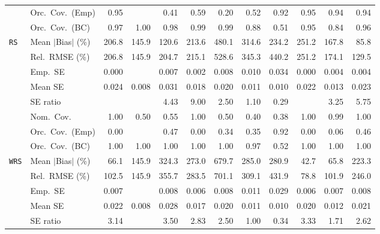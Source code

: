 \begin{landscape}
\begin{longtable}{llrrrrrrrrrr}
 & Orc.\ Cov.\ (Emp) & \cellcolor{rankone}0.95 &  & 0.41 & 0.59 & 0.20 & 0.52 & 0.92 & \cellcolor{ranktwo}0.95 & 0.94 & \cellcolor{rankthree}0.94 \\
 & Orc.\ Cov.\ (BC) & \cellcolor{rankthree}0.97 & 1.00 & 0.98 & 0.99 & 0.99 & 0.88 & 0.51 & \cellcolor{rankone}0.95 & 0.84 & \cellcolor{ranktwo}0.96 \\
\addlinespace[2pt]
\quad \texttt{RS} & Mean $|$Bias$|$ (\%) & 206.8 & \cellcolor{rankthree}145.9 & \cellcolor{ranktwo}120.6 & 213.6 & 480.1 & 314.6 & 234.2 & 251.2 & 167.8 & \cellcolor{rankone}85.8 \\
 & Rel.\ RMSE (\%) & 206.8 & \cellcolor{ranktwo}145.9 & 204.7 & 215.1 & 528.6 & 345.3 & 440.2 & 251.2 & \cellcolor{rankthree}174.1 & \cellcolor{rankone}129.5 \\
 & Emp.\ SE & 0.000 &  & 0.007 & 0.002 & 0.008 & 0.010 & 0.034 & 0.000 & 0.004 & 0.004 \\
 & Mean SE & 0.024 & 0.008 & 0.031 & 0.018 & 0.020 & 0.011 & 0.010 & 0.022 & 0.013 & 0.023 \\
 & SE ratio &  &  & 4.43 & 9.00 & \cellcolor{rankthree}2.50 & \cellcolor{rankone}1.10 & \cellcolor{ranktwo}0.29 &  & 3.25 & 5.75 \\
 & Nom.\ Cov. & \cellcolor{ranktwo}1.00 & 0.50 & 0.55 & \cellcolor{rankthree}1.00 & 0.50 & 0.40 & 0.38 & 1.00 & \cellcolor{rankone}0.99 & 1.00 \\
 & Orc.\ Cov.\ (Emp) & 0.00 &  & \cellcolor{ranktwo}0.47 & 0.00 & 0.34 & 0.35 & \cellcolor{rankone}0.92 & 0.00 & 0.06 & \cellcolor{rankthree}0.46 \\
 & Orc.\ Cov.\ (BC) & \cellcolor{ranktwo}1.00 & \cellcolor{rankthree}1.00 & 1.00 & 1.00 & 1.00 & \cellcolor{rankone}0.97 & 0.52 & 1.00 & 1.00 & 1.00 \\
\addlinespace[2pt]
\quad \texttt{WRS} & Mean $|$Bias$|$ (\%) & \cellcolor{rankthree}66.1 & 145.9 & 324.3 & 273.0 & 679.7 & 285.0 & 280.9 & \cellcolor{rankone}42.7 & \cellcolor{ranktwo}65.8 & 223.3 \\
 & Rel.\ RMSE (\%) & \cellcolor{rankthree}102.5 & 145.9 & 355.7 & 283.5 & 701.1 & 309.1 & 431.9 & \cellcolor{rankone}78.8 & \cellcolor{ranktwo}101.9 & 246.0 \\
 & Emp.\ SE & 0.007 &  & 0.008 & 0.006 & 0.008 & 0.011 & 0.029 & 0.006 & 0.007 & 0.008 \\
 & Mean SE & 0.022 & 0.008 & 0.028 & 0.017 & 0.020 & 0.011 & 0.010 & 0.020 & 0.012 & 0.021 \\
 & SE ratio & 3.14 &  & 3.50 & 2.83 & 2.50 & \cellcolor{rankone}1.00 & \cellcolor{ranktwo}0.34 & 3.33 & \cellcolor{rankthree}1.71 & 2.62 \\

\end{longtable}
\end{landscape}
